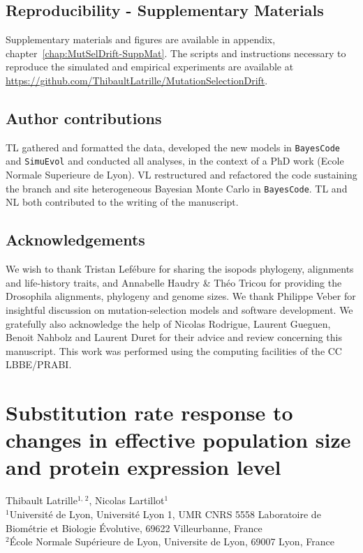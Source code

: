 \documentclass[a4paper,oneside,nobind]{thesis}
\begin{document}
    {\hypersetup{linkcolor=GREYDARK}\minitoc}

    


    \section{Reproducibility - Supplementary Materials}
    Supplementary materials and figures are available in appendix, chapter~\ref{chap:MutSelDrift-SuppMat}.
    The scripts and instructions necessary to reproduce the simulated and empirical experiments are available at \url{https://github.com/ThibaultLatrille/MutationSelectionDrift}.


    \section{Author contributions}
    TL gathered and formatted the data, developed the new models in \texttt{BayesCode} and \texttt{SimuEvol} and conducted all analyses, in the context of a PhD work (Ecole Normale Superieure de Lyon).
    VL restructured and refactored the code sustaining the branch and site heterogeneous Bayesian Monte Carlo in \texttt{BayesCode}.
    TL and NL both contributed to the writing of the manuscript.


    \section{Acknowledgements}
    We wish to thank Tristan Lefébure for sharing the isopods phylogeny, alignments and life-history traits, and Annabelle Haudry \& Théo Tricou for providing the Drosophila alignments, phylogeny and genome sizes.
    We thank Philippe Veber for insightful discussion on mutation-selection models and software development.
    We gratefully also acknowledge the help of Nicolas Rodrigue, Laurent Gueguen, Benoit Nahbolz and Laurent Duret for their advice and review concerning this manuscript.
    This work was performed using the computing facilities of the CC LBBE/PRABI.

    \thispagestyle{empty}
    \chapter[Substitution rate susceptibility]{Substitution rate response to changes in effective population size and protein expression level}
    \label{chap:GenoPhenoFit}

    \begin{center}
        \Large Thibault Latrille$^{\text{1, 2}}$, Nicolas Lartillot$^{\text{1}}$\\
        \vspace{0.5cm}
        \normalsize
        $^{\text{1}}$Université de Lyon, Université Lyon 1, UMR CNRS 5558 Laboratoire de Biométrie et Biologie Évolutive, 69622 Villeurbanne, France\\
        $^{\text{2}}$École Normale Supérieure de Lyon, Universite de Lyon, 69007 Lyon, France\\
    \end{center}
\end{document}
